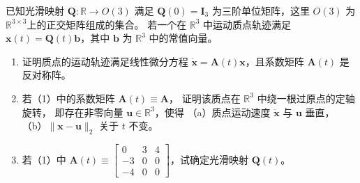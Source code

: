 已知光滑映射 $\boldsymbol{Q}: \mathbb{R} \rightarrow O(3)$ 满足 $\boldsymbol{Q}(0)=\boldsymbol{I}_{3}$ 为三阶单位矩阵，这里 $O(3)$ 为 $\mathbb{R}^{3 \times 3}$上的正交矩阵组成的集合。
若一个在 $\mathbb{R}^{3}$ 中运动质点轨迹满足 $\boldsymbol{x}(t)=\boldsymbol{Q}(t) \boldsymbol{b}$，其中 $\boldsymbol{b}$ 为 $\mathbb{R}^{3}$ 中的常值向量。
\begin{enumerate}[label=(\arabic*)]
\item 证明质点的运动轨迹满足线性微分方程 $\dot{\boldsymbol{x}}=\boldsymbol{A}(t) \boldsymbol{x}$，且系数矩阵 $\boldsymbol{A}(t)$ 是反对称阵。
\item 若（1）中的系数矩阵 $\boldsymbol{A}(t) \equiv \boldsymbol{A}$，
证明该质点在 $\mathbb{R}^{3}$ 中绕一根过原点的定轴旋转，
即存在非零向量 $\boldsymbol{u} \in \mathbb{R}^{3}$，使得
（a）质点运动速度 $\dot{\boldsymbol{x}}$ 与 $\boldsymbol{u}$ 垂直，
（b）$\|\boldsymbol{x}-\boldsymbol{u}\|_{2}$ 关于 $t$ 不变。
\item 若（1）中 $\boldsymbol{A}(t) \equiv\begin{bmatrix}0 & 3 & 4 \\ -3 & 0 & 0 \\ -4 & 0 & 0\end{bmatrix}$，试确定光滑映射 $\boldsymbol{Q}(t)$。
\end{enumerate}
